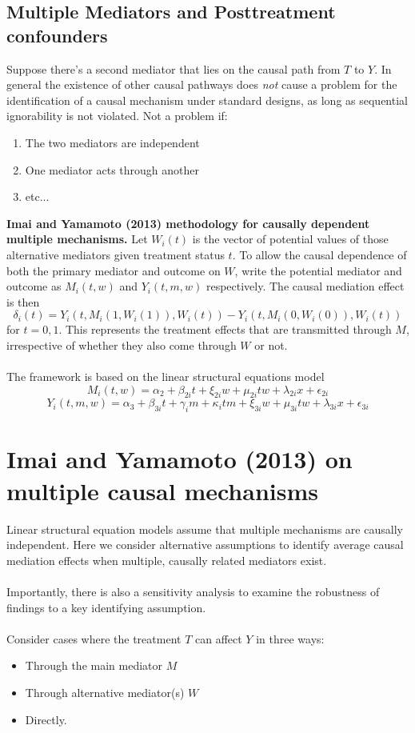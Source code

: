 \documentclass{article}
\begin{document}
	
	\subsection{Multiple Mediators and Posttreatment confounders}
	
	Suppose there's a second mediator that lies on the causal path from $T$ to $Y$.  In general the existence of other causal pathways does \textit{not} cause a problem for the identification of a causal mechanism under standard designs, as long as sequential ignorability is not violated. Not a problem if:
	\begin{enumerate}
		\item The two mediators are independent
		\item One mediator acts through another
		\item etc...
	\end{enumerate}


	\textbf{Imai and Yamamoto (2013) methodology for causally dependent multiple mechanisms. } Let $W_i(t)$ is the vector of potential values of those alternative mediators given treatment status $t$. To allow the causal dependence of both the primary mediator and outcome on $W$, write the potential mediator and outcome as $M_i(t,w)$ and $Y_i(t,m,w)$ respectively. The causal mediation effect is then 
	$$
	\delta_i(t) = Y_i(t, M_i(1, W_i(1)), W_i(t)) - Y_i(t, M_i(0, W_i(0)), W_i(t))
	$$
	for $t = 0, 1$. This represents the treatment effects that are transmitted through $M$, irrespective of whether they also come through $W$ or not. 
	\\~\\
	The framework is based on the linear structural equations model
	$$
	M_i(t,w) = \alpha_2 + \beta_{2i} t + \xi_{2i} w + \mu_{2i} tw + \lambda_{2i} x + \epsilon_{2i}
	$$
	$$
	Y_i(t,m,w) = \alpha_3 + \beta_{3i} t + \gamma_i m + \kappa_i t m + \xi_{3i} w + \mu_{3i} tw + \lambda_{3i} x + \epsilon_{3i}
	$$
	
	

	\section{Imai and Yamamoto (2013) on multiple causal mechanisms}
	
	
	Linear structural equation models assume that multiple mechanisms are causally independent. Here we consider alternative assumptions to identify average causal mediation effects when multiple, causally related mediators exist. 
	\\~\\
	Importantly, there is also a sensitivity analysis to examine the robustness of findings to a key identifying assumption. 
	\\~\\
	Consider cases where the treatment $T$ can affect $Y$ in three ways:
	\begin{itemize}
		\item Through the main mediator $M$
		\item Through alternative mediator(s) $W$
		\item Directly. 
	\end{itemize}
	
\end{document}
